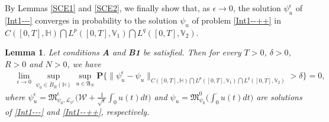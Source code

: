 \documentclass[11pt]{article}
\newtheorem{lemma}[theorem]{Lemma}
\numberwithin{equation}{section}
\begin{document}
By Lemmas \ref{SCE1} and \ref{SCE2}, we finally show that, as $\epsilon\rightarrow0$, the solution $\psi^\epsilon_u$ of \eqref{Int1---} converges in probability to the solution $\psi_u$ of problem \eqref{Int1--++} in $ C([0,T],\mathbb{H}) \bigcap L^p([0,T], \mathbb{V}_1)\bigcap L^q([0,T], \mathbb{V}_2)$.
\begin{lemma}\label{SCE3}
Let conditions  {\bf A} and {\bf B1}
be satisfied. Then for every $T>0$, $\delta>0$, $R>0$ and $N>0$, we have
\begin{align*}
&\lim_{\epsilon\rightarrow0}\sup_{\psi_{0}\in \overline{B}_{R}(\mathbb{H})}
\sup_{u\in \mathfrak{A}_N}\mathbf{P}\Big\{ \|\psi^\epsilon_u-\psi_u\|_{C([0,T],\mathbb{H}) \bigcap L^p([0,T], \mathbb{V}_1)\bigcap L^q([0,T], \mathbb{V}_2)}>\delta\Big\}=0,
\end{align*}
where $\psi^\epsilon_u=
\mathfrak{M}_{\psi_0,\mathcal{L}_{
\psi^\epsilon}}^\epsilon
\big(\mathcal{W}+\frac{1}{\sqrt{\epsilon}}
\int_0^\cdot u(t)dt\big)$ and $\psi_u=
\mathfrak{M}_{\psi_0}^0
\big(
\int_0^\cdot u(t)dt\big)$ are solutions of \eqref{Int1---} and \eqref{Int1--++}, respectively.
\end{lemma}
\end{document}
